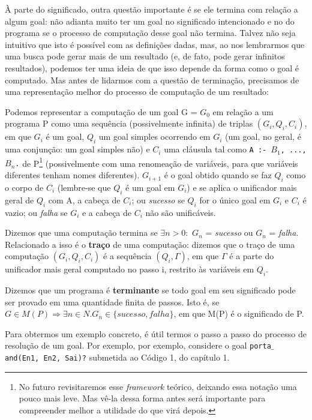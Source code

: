 \documentclass{article}
\theoremstyle{definition}
\theoremstyle{remark}
\begin{document}
À parte do significado, outra questão importante é se ele termina com relação a algum goal: não adianta muito ter um goal no significado intencionado e no do programa se o processo de computação desse goal não termina. Talvez não seja intuitivo que isto é possível com as definições dadas, mas, ao nos lembrarmos que uma busca pode gerar mais de um resultado (e, de fato, pode gerar infinitos resultados), podemos ter uma ideia de que isso depende da forma como o goal é
computado. Mas antes de lidarmos com a questão de terminação, precisamos de uma representação melhor do processo de computação de um resultado:

Podemos representar a computação de um goal G = $G_0$ em relação a um programa P como uma sequência (possivelmente infinita) de triplas \textit{$(G_i, Q_i, C_i)$}, em que $G_i$ é um
goal, $Q_i$ um goal simples ocorrendo em $G_i$ (um goal, no geral, é uma conjunção: um goal simples não) e $C_i$ uma cláusula tal como  {\tt A :- $B_1$, ..., $B_n$.} de P\footnote{No futuro revisitaremos esse \textit{framework} teórico, deixando essa notação uma pouco mais leve. Mas vê-la dessa forma antes será importante para compreender melhor a utilidade do que virá depois.} (possivelmente com uma renomeação de variáveis, para que variáveis diferentes tenham nomes diferentes). $G_{i+1}$ é o goal obtido quando se faz $Q_i$ como o corpo de $C_i$ (lembre-se que $Q_i$ é um goal em $G_i$) e se aplica o unificador mais geral de $Q_i$ com A, a cabeça de $C_i$; ou \textit{sucesso} se $Q_i$ for o único goal em $G_i$ e $C_i$ é vazio; ou \textit{falha} se $G_i$ e a cabeça de $C_i$ não são unificáveis.

Dizemos que uma computação termina se $\exists n > 0:$ $G_n$ = \textit{sucesso} ou $G_n$ = \textit{falha}. Relacionado a isso é o \textbf{traço} de uma computação: dizemos que o traço de uma computação $(G_i, Q_i, C_i)$ é a sequência $(Q_i, \Gamma)$, em que $\Gamma$ é a parte do unificador mais geral computado no passo i, restrito às variáveis em $Q_i$.

Dizemos que um programa é \textbf{terminante} se todo goal em seu significado pode ser provado em uma quantidade finita de passos. Isto é, se $G \in M(P) \Rightarrow \exists n \in N. G_n \in \{sucesso, falha\}$, em que M(P) é o significado de P.

Para obtermos um exemplo concreto, é útil termos o passo a passo do processo de resolução de um goal. Por exemplo, por exemplo, considere o goal {\tt porta$\_$and(En1, En2, Sai)?} submetida ao Código 1, do capítulo 1.
\end{document}
